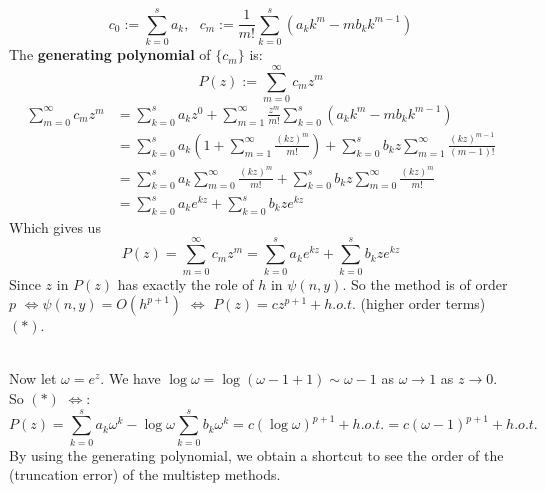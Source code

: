 \documentclass[a4paper, 11pt]{article}
\begin{document}
$$
c_0 := \sum_{k=0}^s a_k,~~~c_m := \frac{1}{m!}\sum_{k=0}^s (a_k k^m - mb_k k^{m-1})
$$
The \textbf{generating polynomial} of $\{c_m\}$ is:
$$
P(z) := \sum_{m=0}^{\infty} c_m z^m
$$
\begin{equation}
	\begin{split}
		\sum_{m=0}^{\infty} c_m z^m &=  \sum_{k=0}^s a_k z^0 + \sum_{m=1}^{\infty}\frac{z^m}{m!}\sum_{k=0}^s (a_k k^m - mb_k k^{m-1})  \\
		&= \sum_{k=0}^s a_k \left(1+\sum_{m=1}^{\infty}\frac{(kz)^m}{m!}\right) + \sum_{k=0}^s b_k z\sum_{m=1}^{\infty}\frac{(kz)^{m-1}}{(m-1)!}\\
		&= \sum_{k=0}^s a_k \sum_{m=0}^{\infty}\frac{(kz)^m}{m!}+ \sum_{k=0}^s b_k z\sum_{m=0}^{\infty}\frac{(kz)^{m}}{m!} \\
		&= \sum_{k=0}^s a_k e^{kz}+ \sum_{k=0}^s b_k z e^{kz}
	\end{split}
\end{equation}
Which gives us
$$
P(z) = \sum_{m=0}^{\infty} c_m z^m = \sum_{k=0}^s a_k e^{kz}+ \sum_{k=0}^s b_k z e^{kz}
$$
Since $z$ in $P(z)$ has exactly the role of $h$ in $\psi(n,y)$. So the method is of order $p$ $\iff \psi(n,y) = O(h^{p+1})$ $\iff$ $P(z) = cz^{p+1} + h.o.t.$ (higher order terms) $(*)$.

~\\
Now let $\omega=e^z$. We have $\log \omega = \log(\omega -1+1) \sim \omega -1 $ as $\omega\to1$ as $z\to 0$. So $(*)$ $\iff$:
$$
P(z) = \sum_{k=0}^s a_k \omega^k - \log\omega \sum_{k=0}^s b_k \omega^k = c (\log \omega)^{p+1} + h.o.t. = c(\omega - 1)^{p+1} + h.o.t.
$$
By using the generating polynomial, we obtain a shortcut to see the order of the (truncation error) of the multistep methods.
\end{document}
